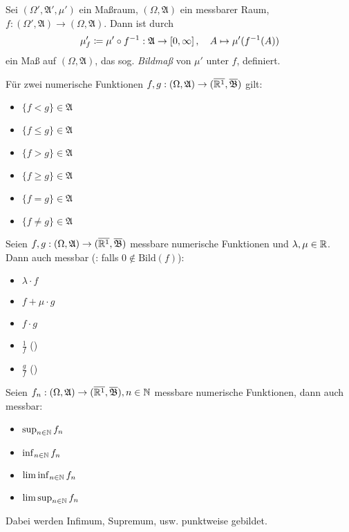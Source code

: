 \documentclass{cheat-sheet}
\newcommand{\Alg}{\mathfrak{A}} %
\newcommand{\Bor}{\mathfrak{B}} %
\renewcommand{\ER}{\overline{\R^1}} %
\begin{document}
\begin{defn}
  Sei $(\Omega', \Alg', \mu')$ ein Maßraum, $(\Omega, \Alg)$ ein messbarer Raum, $f : (\Omega', \Alg) \to (\Omega, \Alg)$. Dann ist durch
  \[ \mu'_f \coloneqq \mu' \circ f^{-1} : \Alg \to \cinterval{0}{\infty}, \quad A \mapsto \mu'(f^{-1}(A)) \]
  ein Maß auf $(\Omega, \Alg)$, das sog. \emph{Bildmaß} von $\mu'$ unter $f$, definiert.
\end{defn}

\begin{satz}
  Für zwei numerische Funktionen $f, g : (\Omega, \Alg) \to (\ER, \overline{\Bor})$ gilt:
  \begin{multicols}{3}
    \begin{itemize}
      \item $\{ f < g \} \in \Alg$
      \item $\{ f \leq g \} \in \Alg$
      \item $\{ f > g \} \in \Alg$
      \item $\{ f \geq g \} \in \Alg$
      \item $\{ f = g \} \in \Alg$
      \item $\{ f \not= g \} \in \Alg$
    \end{itemize}
  \end{multicols}
\end{satz}

\begin{satz}
  Seien $f, g : (\Omega, \Alg) \to (\ER, \overline{\Bor})$ messbare numerische Funktionen und $\lambda, \mu \in \mathbb{R}$. Dann auch messbar (\ddag: falls $0 \not\in \mathrm{Bild}(f)$):
  \begin{multicols}{5}
    \begin{itemize}
      \item $\lambda \cdot f$
      \item $f + \mu \cdot g$
      \item $f \cdot g$
      \item $\tfrac{1}{f}$ (\ddag)
      \item $\tfrac{g}{f}$ (\ddag)
    \end{itemize}
  \end{multicols}
\end{satz}

\begin{satz}
  Seien $f_n : (\Omega, \Alg) \to (\ER, \overline{\Bor}), n \in \N$ messbare numerische Funktionen, dann auch messbar:
  \begin{multicols}{4}
    \begin{itemize}
      \item $\sup_{n \in \mathbb{N}} f_n$
      \item $\inf_{n \in \mathbb{N}} f_n$
      \item $\liminf_{n \in \mathbb{N}} f_n$
      \item $\limsup_{n \in \mathbb{N}} f_n$
    \end{itemize}
  \end{multicols}
  \vspace{4pt}
  Dabei werden Infimum, Supremum, usw. punktweise gebildet.
\end{satz}
\end{document}
